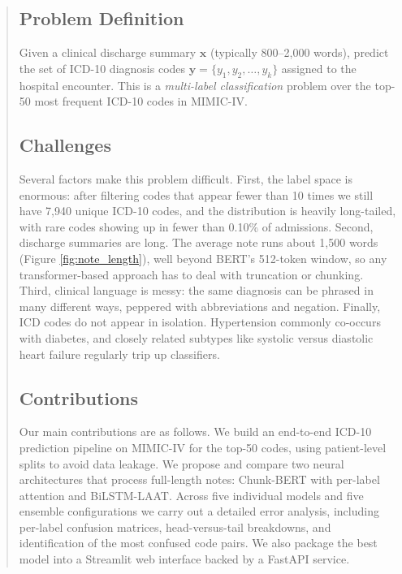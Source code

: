 \documentclass[11pt,a4paper]{article}
\begin{document}
\begin{abstract}
\subsection{Problem Definition}
Given a clinical discharge summary $\mathbf{x}$ (typically 800--2,000 words), predict the set of ICD-10 diagnosis codes $\mathbf{y} = \{y_1, y_2, \ldots, y_k\}$ assigned to the hospital encounter. This is a \textit{multi-label classification} problem over the top-50 most frequent ICD-10 codes in MIMIC-IV.

\subsection{Challenges}
Several factors make this problem difficult. First, the label space is enormous: after filtering codes that appear fewer than 10 times we still have 7,940 unique ICD-10 codes, and the distribution is heavily long-tailed, with rare codes showing up in fewer than 0.10\% of admissions. Second, discharge summaries are long. The average note runs about 1,500 words (Figure \ref{fig:note_length}), well beyond BERT's 512-token window, so any transformer-based approach has to deal with truncation or chunking. Third, clinical language is messy: the same diagnosis can be phrased in many different ways, peppered with abbreviations and negation. Finally, ICD codes do not appear in isolation. Hypertension commonly co-occurs with diabetes, and closely related subtypes like systolic versus diastolic heart failure regularly trip up classifiers.

\subsection{Contributions}
Our main contributions are as follows. We build an end-to-end ICD-10 prediction pipeline on MIMIC-IV for the top-50 codes, using patient-level splits to avoid data leakage. We propose and compare two neural architectures that process full-length notes: Chunk-BERT with per-label attention and BiLSTM-LAAT. Across five individual models and five ensemble configurations we carry out a detailed error analysis, including per-label confusion matrices, head-versus-tail breakdowns, and identification of the most confused code pairs. We also package the best model into a Streamlit web interface backed by a FastAPI service.

\begin{figure}[H]
\centering
\resizebox{0.98\textwidth}{!}{%
\begin{tikzpicture}[node distance=0.55cm and 0.45cm]


\end{tikzpicture}}
\end{figure}
\end{abstract}
\end{document}
